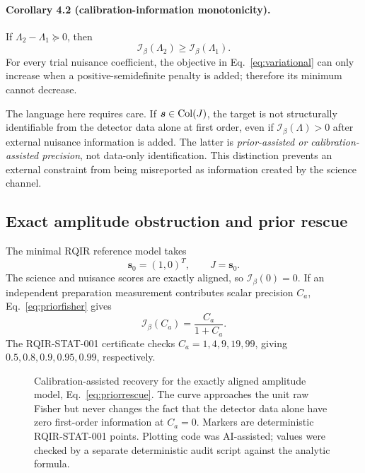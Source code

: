 \paragraph*{Corollary 4.2 (calibration-information monotonicity).}
If $\Lambda_2-\Lambda_1\succeq0$, then
\begin{equation}
 \mathcal I_\beta(\Lambda_2)\ge\mathcal I_\beta(\Lambda_1).
\label{eq:priormono}
\end{equation}
For every trial nuisance coefficient, the objective in Eq.~\eqref{eq:variational} can only increase when a positive-semidefinite penalty is added; therefore its minimum cannot decrease.

The language here requires care. If $\bm s\in\operatorname{Col}(J)$, the target is not structurally identifiable from the detector data alone at first order, even if $\mathcal I_\beta(\Lambda)>0$ after external nuisance information is added. The latter is \emph{prior-assisted or calibration-assisted precision}, not data-only identification. This distinction prevents an external constraint from being misreported as information created by the science channel.

\subsection{Exact amplitude obstruction and prior rescue}

The minimal RQIR reference model takes
\begin{equation}
 \bm s_0=(1,0)^T,\qquad J=\bm s_0.
\end{equation}
The science and nuisance scores are exactly aligned, so $\mathcal I_\beta(0)=0$. If an independent preparation measurement contributes scalar precision $C_a$, Eq.~\eqref{eq:priorfisher} gives
\begin{equation}
 \boxed{\displaystyle
 \mathcal I_\beta(C_a)=\frac{C_a}{1+C_a}.}
\label{eq:priorrescue}
\end{equation}
The RQIR-STAT-001 certificate checks $C_a=1,4,9,19,99$, giving $0.5,0.8,0.9,0.95,0.99$, respectively.

\begin{figure}[t]
\centering

\caption{Calibration-assisted recovery for the exactly aligned amplitude model, Eq.~\eqref{eq:priorrescue}. The curve approaches the unit raw Fisher but never changes the fact that the detector data alone have zero first-order information at $C_a=0$. Markers are deterministic RQIR-STAT-001 points. Plotting code was AI-assisted; values were checked by a separate deterministic audit script against the analytic formula.}
\label{fig:priorrescue}
\end{figure}

